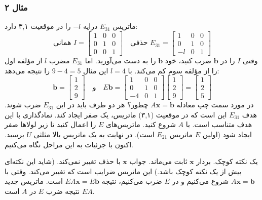 \documentclass[12pt, a4paper]{book}
\begin{document}
	\subsubsection*{مثال ۲}
	ماتریس $E_{31}$ درایه $-l$ را در موقعیت ۳,۱ دارد:
	\[
	\text{همانی } I = \begin{bmatrix} 1 & 0 & 0 \\ 0 & 1 & 0 \\ 0 & 0 & 1 \end{bmatrix} \quad
	\text{حذفی } E_{31} = \begin{bmatrix} 1 & 0 & 0 \\ 0 & 1 & 0 \\ -l & 0 & 1 \end{bmatrix}
	\]
	وقتی $I$ را در $\mathbf{b}$ ضرب کنید، خود $\mathbf{b}$ را به دست می‌آورید. اما $E_{31}$ مضرب $l$ از مؤلفه اول را از مؤلفه سوم کم می‌کند. با $l=4$ این مثال $9-4=5$ را نتیجه می‌دهد:
	\[
	\mathbf{b} = \begin{bmatrix} 1 \\ 2 \\ 9 \end{bmatrix} \quad \text{و} \quad
	E\mathbf{b} = \begin{bmatrix} 1 & 0 & 0 \\ 0 & 1 & 0 \\ -4 & 0 & 1 \end{bmatrix}
	\begin{bmatrix} 1 \\ 2 \\ 9 \end{bmatrix}
	=
	\begin{bmatrix} 1 \\ 2 \\ 5 \end{bmatrix}
	\]
	در مورد سمت چپ معادله $A\mathbf{x}=\mathbf{b}$ چطور؟ هر دو طرف باید در این $E_{31}$ ضرب شوند.
	هدف $E_{31}$ این است که در موقعیت (۳,۱) ماتریس، یک صفر ایجاد کند.
	نمادگذاری با این هدف متناسب است. با $A$ شروع کنید. ماتریس‌های $E$ را اعمال کنید تا زیر لولاها صفر ایجاد شود (اولین $E$ ماتریس $E_{21}$ است). در نهایت به یک ماتریس بالا مثلثی $U$ برسید. اکنون با جزئیات به این مراحل نگاه می‌کنیم.
	
	یک نکته کوچک. بردار $\mathbf{x}$ ثابت می‌ماند. جواب $\mathbf{x}$ با حذف تغییر نمی‌کند. (شاید این نکته‌ای بیش از یک نکته کوچک باشد.) این ماتریس ضرایب است که تغییر می‌کند. وقتی با $A\mathbf{x}=\mathbf{b}$ شروع می‌کنیم و در $E$ ضرب می‌کنیم، نتیجه $EA\mathbf{x}=E\mathbf{b}$ است.
	ماتریس جدید $EA$ نتیجه ضرب $E$ در $A$ است.
	
\end{document}
